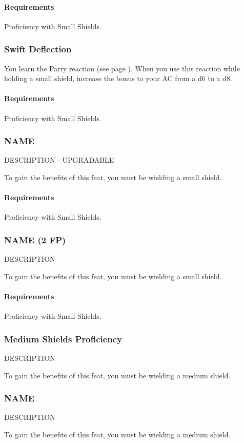    \paragraph{Requirements} Proficiency with Small Shields.
\subsubsection{Swift Deflection} \label{feat::swiftdeflection}
    You learn the Parry reaction (see page \pageref{act::parry}).
    When you use this reaction while holding a small shield, increase the bonus to your AC from a d6 to a d8.
    \paragraph{Requirements} Proficiency with Small Shields.
\subsubsection{NAME} \label{feat::name}
    DESCRIPTION - UPGRADABLE

    To gain the benefits of this feat, you must be wielding a small shield.
    \paragraph{Requirements} Proficiency with Small Shields.
\subsubsection{NAME (2 FP)} \label{feat::name}
    DESCRIPTION

    To gain the benefits of this feat, you must be wielding a small shield.
    \paragraph{Requirements} Proficiency with Small Shields.
\subsubsection{Medium Shields Proficiency} \label{feat::name}
    DESCRIPTION

    To gain the benefits of this feat, you must be wielding a medium shield.
\subsubsection{NAME} \label{feat::name}
    DESCRIPTION

    To gain the benefits of this feat, you must be wielding a medium shield.

